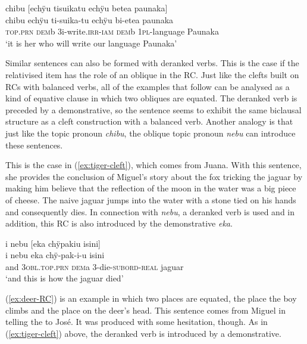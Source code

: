 \ea\label{ex:cleft-Lena}
\begingl
\glpreamble chibu \textup{[}echÿu tisuikatu echÿu betea paunaka\textup{]}\\
\gla chibu echÿu ti-suika-tu echÿu bi-etea paunaka\\
\textsc{top.prn} \textsc{dem}b 3i-write.\textsc{irr}-\textsc{iam} \textsc{dem}b 1\textsc{pl}-language Paunaka\\
\glft ‘it is her who will write our language Paunaka’
\endgl
\trailingcitation{[ump-p110815sf.116]}
\xe



Similar sentences can also be formed with deranked verbs. This is the case if the relativised item has the role of an oblique in the RC. Just like the clefts built on RCs with balanced verbs, all of the examples that follow can be analysed as a kind of equative clause in which two obliques are equated. The deranked verb is preceded by a demonstrative, so the sentence seems to exhibit the same biclausal structure as a cleft construction with a balanced verb. Another analogy is that just like the topic pronoun \textit{chibu}, the oblique topic pronoun \textit{nebu} can introduce these sentences. 

This is the case in (\ref{ex:tiger-cleft}), which comes from Juana. With this sentence, she provides the conclusion of Miguel’s story about the fox tricking the jaguar by making him believe that the reflection of the moon in the water was a big piece of cheese. The naive jaguar jumps into the water with a stone tied on his hands and consequently dies. In connection with \textit{nebu}, a deranked verb is used and in addition, this RC is also introduced by the demonstrative \textit{eka}.

\ea\label{ex:tiger-cleft}
\begingl
\glpreamble i nebu \textup{[}eka chÿpakiu isini\textup{]}\\
\gla i nebu eka chÿ-pak-i-u isini\\
\glb and 3\textsc{obl.top.prn} \textsc{dem}a 3-die-\textsc{subord}-\textsc{real} jaguar\\
\glft ‘and this is how the jaguar died’
\endgl
\trailingcitation{[jmx-n120429ls-x5.265]}
\xe
{}

(\ref{ex:deer-RC}) is an example in which two places are equated, the place the boy climbs and the place on the deer’s head. This sentence comes from Miguel in telling the  to José. It was produced with some hesitation, though. As in (\ref{ex:tiger-cleft}) above, the deranked verb is introduced by a demonstrative.

